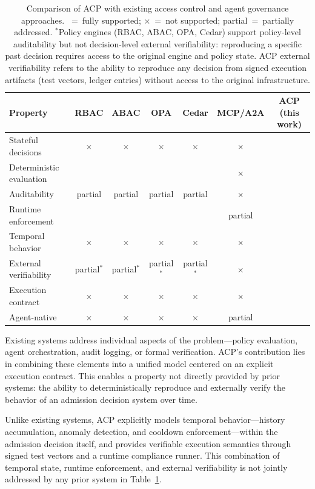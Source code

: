 \documentclass[11pt]{article}
\theoremstyle{definition}
\newcommand{\yes}{\checkmark}
\newcommand{\no}{$\times$}
\begin{document}
\begin{table}[h!]
\centering
\small
\begin{tabular}{@{}lcccccc@{}}
\toprule
\textbf{Property} & \textbf{RBAC} & \textbf{ABAC} & \textbf{OPA} & \textbf{Cedar} & \textbf{MCP/A2A} & \textbf{ACP (this work)} \\
\midrule
Stateful decisions       & \no & \no & \no & \no & \no & \yes \\
Deterministic evaluation & \yes & \yes & \yes & \yes & \no & \yes \\
Auditability             & partial & partial & partial & partial & \no & \yes \\
Runtime enforcement      & \yes & \yes & \yes & \yes & partial & \yes \\
Temporal behavior        & \no & \no & \no & \no & \no & \yes \\
External verifiability   & partial$^*$ & partial$^*$ & partial$^*$ & partial$^*$ & \no & \yes \\
Execution contract       & \no & \no & \no & \no & \no & \yes \\
Agent-native             & \no & \no & \no & \no & partial & \yes \\
\bottomrule
\end{tabular}
\caption{Comparison of ACP with existing access control and agent governance approaches.
\yes~=~fully supported; \no~=~not supported; partial~=~partially addressed.
$^*$Policy engines (RBAC, ABAC, OPA, Cedar) support policy-level auditability but not
decision-level external verifiability: reproducing a specific past decision requires
access to the original engine and policy state.
ACP external verifiability refers to the ability to reproduce any decision from
signed execution artifacts (test vectors, ledger entries) without access to the
original infrastructure.}
\label{tab:comparison}
\end{table}

Existing systems address individual aspects of the problem---policy evaluation,
agent orchestration, audit logging, or formal verification.
ACP's contribution lies in combining these elements into a unified model centered on
an explicit execution contract.
This enables a property not directly provided by prior systems:
the ability to deterministically reproduce and externally verify the behavior of
an admission decision system over time.

Unlike existing systems, ACP explicitly models temporal behavior---history accumulation,
anomaly detection, and cooldown enforcement---within the admission decision itself,
and provides verifiable execution semantics through signed test vectors and a runtime compliance runner.
This combination of temporal state, runtime enforcement, and external verifiability
is not jointly addressed by any prior system in Table~\ref{tab:comparison}.
\end{document}
